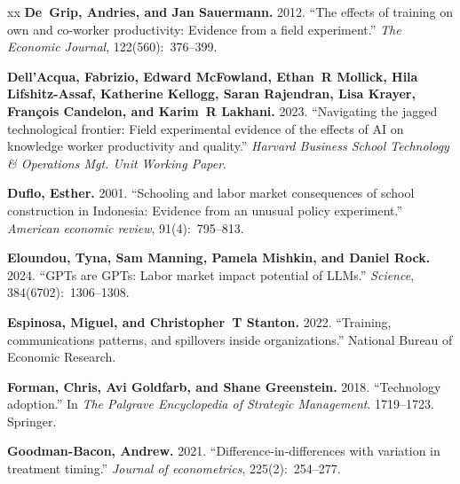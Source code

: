 \documentclass{article}
\begin{document}
\begin{thebibliography}{xx}
{\bf De~Grip, Andries, and Jan Sauermann.} 2012. ``The effects of training on own and co-worker productivity: Evidence from a field experiment.'' {\em The Economic Journal}, 122(560):~376--399.

{\bf Dell'Acqua, Fabrizio, Edward McFowland, Ethan~R Mollick, Hila Lifshitz-Assaf, Katherine Kellogg, Saran Rajendran, Lisa Krayer, Fran{\c{c}}ois Candelon, and Karim~R Lakhani.} 2023. ``Navigating the jagged technological frontier: Field experimental evidence of the effects of AI on knowledge worker productivity and quality.'' {\em Harvard Business School Technology \& Operations Mgt. Unit Working Paper}.

{\bf Duflo, Esther.} 2001. ``Schooling and labor market consequences of school construction in Indonesia: Evidence from an unusual policy experiment.'' {\em American economic review}, 91(4):~795--813.

{\bf Eloundou, Tyna, Sam Manning, Pamela Mishkin, and Daniel Rock.} 2024. ``GPTs are GPTs: Labor market impact potential of LLMs.'' {\em Science}, 384(6702):~1306--1308.

{\bf Espinosa, Miguel, and Christopher~T Stanton.} 2022. ``Training, communications patterns, and spillovers inside organizations.'' National Bureau of Economic Research.

{\bf Forman, Chris, Avi Goldfarb, and Shane Greenstein.} 2018. ``Technology adoption.'' In {\em The Palgrave Encyclopedia of Strategic Management}. 1719--1723. Springer.

{\bf Goodman-Bacon, Andrew.} 2021. ``Difference-in-differences with variation in treatment timing.'' {\em Journal of econometrics}, 225(2):~254--277.


\end{thebibliography}
\end{document}
